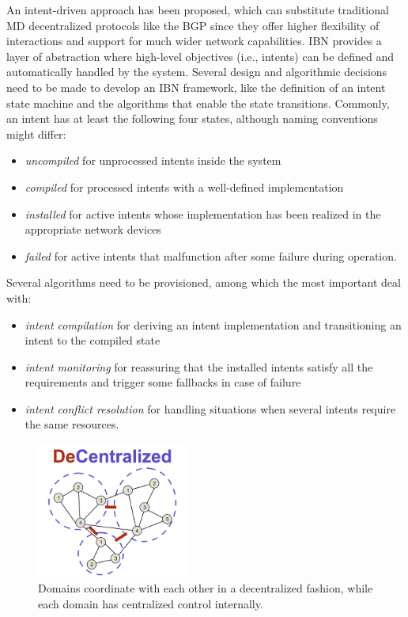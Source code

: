 \documentclass{juliacon}
\begin{document}
    An intent-driven approach \cite{2023ietf, 2022ChristouCNSM} has been proposed, which can substitute traditional \ac{MD} decentralized protocols like the \ac{BGP} since they offer higher flexibility of interactions and support for much wider network capabilities.
    \ac{IBN} provides a layer of abstraction where high-level objectives (i.e., intents) can be defined and automatically handled by the system.
    Several design and algorithmic decisions need to be made to develop an \ac{IBN} framework, like the definition of an intent state machine and the algorithms that enable the state transitions.
    Commonly, an intent has at least the following four states, although naming conventions might differ:
    \begin{itemize}
        \item \emph{uncompiled} for unprocessed intents inside the system
        \item \emph{compiled} for processed intents with a well-defined implementation
        \item \emph{installed} for active intents whose implementation has been realized in the appropriate network devices
        \item \emph{failed} for active intents that malfunction after some failure during operation.
    \end{itemize}
    Several algorithms need to be provisioned, among which the most important deal with:
    \begin{itemize}
        \item \emph{intent compilation} for deriving an intent implementation and transitioning an intent to the compiled state
        \item \emph{intent monitoring} for reassuring that the installed intents satisfy all the requirements and trigger some fallbacks in case of failure
        \item \emph{intent conflict resolution} for handling situations when several intents require the same resources.
    \end{itemize}


    \begin{figure}[t]
    \centerline{\includegraphics[width=5cm]{Motive.pdf}}
    \caption{Domains coordinate with each other in a decentralized fashion, while each domain has centralized control internally.}
        \label{fig:DeCentralized}
    \end{figure}
\end{document}
